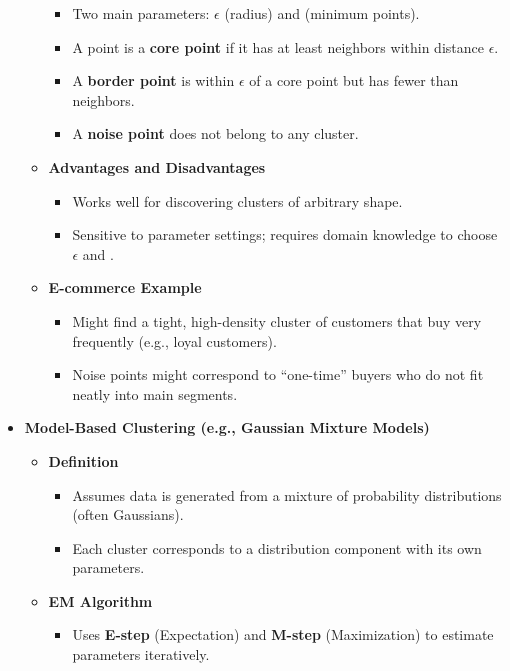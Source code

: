 \documentclass[10pt]{article}
\begin{document}
\begin{itemize}
\begin{itemize}
        \begin{itemize}
            \item Two main parameters: $\epsilon$ (radius) and  (minimum points).
            \item A point is a \textbf{core point} if it has at least  neighbors within distance $\epsilon$.
            \item A \textbf{border point} is within $\epsilon$ of a core point but has fewer than  neighbors.
            \item A \textbf{noise point} does not belong to any cluster.
        \end{itemize}
        \item \textbf{Advantages and Disadvantages}
        \begin{itemize}
            \item Works well for discovering clusters of arbitrary shape.
            \item Sensitive to parameter settings; requires domain knowledge to choose $\epsilon$ and .
        \end{itemize}
        \item \textbf{E-commerce Example}
        \begin{itemize}
            \item Might find a tight, high-density cluster of customers that buy very frequently (e.g., loyal customers).
            \item Noise points might correspond to “one-time” buyers who do not fit neatly into main segments.
        \end{itemize}
    \end{itemize}
    \item \textbf{Model-Based Clustering (e.g., Gaussian Mixture Models)}
    \begin{itemize}
        \item \textbf{Definition}
        \begin{itemize}
            \item Assumes data is generated from a mixture of probability distributions (often Gaussians).
            \item Each cluster corresponds to a distribution component with its own parameters.
        \end{itemize}
        \item \textbf{EM Algorithm}
        \begin{itemize}
            \item Uses \textbf{E-step} (Expectation) and \textbf{M-step} (Maximization) to estimate parameters iteratively.

\end{itemize}
\end{itemize}
\end{itemize}
\end{document}
